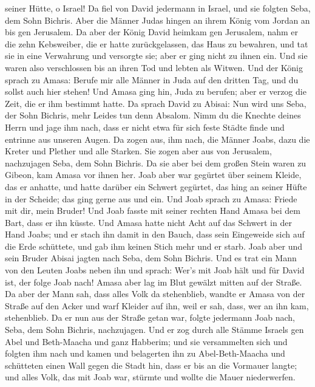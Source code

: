seiner Hütte, o Israel!  Da fiel von David jedermann in
Israel, und sie folgten Seba, dem Sohn Bichris. Aber die Männer Judas
hingen an ihrem König vom Jordan an bis gen Jerusalem.  Da
aber der König David heimkam gen Jerusalem, nahm er die zehn Kebsweiber,
die er hatte zurückgelassen, das Haus zu bewahren, und tat sie in eine
Verwahrung und versorgte sie; aber er ging nicht zu ihnen ein. Und sie
waren also verschlossen bis an ihren Tod und lebten als Witwen.
 Und der König sprach zu Amasa: Berufe mir alle Männer in
Juda auf den dritten Tag, und du sollst auch hier stehen! 
Und Amasa ging hin, Juda zu berufen; aber er verzog die Zeit, die er ihm
bestimmt hatte.  Da sprach David zu Abisai: Nun wird uns
Seba, der Sohn Bichris, mehr Leides tun denn Absalom. Nimm du die
Knechte deines Herrn und jage ihm nach, dass er nicht etwa für sich
feste Städte finde und entrinne aus unseren Augen.  Da zogen
aus, ihm nach, die Männer Joabs, dazu die Kreter und Plether und alle
Starken. Sie zogen aber aus von Jerusalem, nachzujagen Seba, dem Sohn
Bichris.  Da sie aber bei dem großen Stein waren zu Gibeon,
kam Amasa vor ihnen her. Joab aber war gegürtet über seinem Kleide, das
er anhatte, und hatte darüber ein Schwert gegürtet, das hing an seiner
Hüfte in der Scheide; das ging gerne aus und ein.  Und Joab
sprach zu Amasa: Friede mit dir, mein Bruder! Und Joab fasste mit seiner
rechten Hand Amasa bei dem Bart, dass er ihn küsste.  Und
Amasa hatte nicht Acht auf das Schwert in der Hand Joabs; und er stach
ihn damit in den Bauch, dass sein Eingeweide sich auf die Erde
schüttete, und gab ihm keinen Stich mehr und er starb. Joab aber und
sein Bruder Abisai jagten nach Seba, dem Sohn Bichris.  Und
es trat ein Mann von den Leuten Joabs neben ihn und sprach: Wer's mit
Joab hält und für David ist, der folge Joab nach!  Amasa
aber lag im Blut gewälzt mitten auf der Straße. Da aber der Mann sah,
dass alles Volk da stehenblieb, wandte er Amasa von der Straße auf den
Acker und warf Kleider auf ihn, weil er sah, dass, wer an ihn kam,
stehenblieb.  Da er nun aus der Straße getan war, folgte
jedermann Joab nach, Seba, dem Sohn Bichris, nachzujagen. 
Und er zog durch alle Stämme Israels gen Abel und Beth-Maacha und ganz
Habberim; und sie versammelten sich und folgten ihm nach 
und kamen und belagerten ihn zu Abel-Beth-Maacha und schütteten einen
Wall gegen die Stadt hin, dass er bis an die Vormauer langte; und alles
Volk, das mit Joab war, stürmte und wollte die Mauer niederwerfen.

